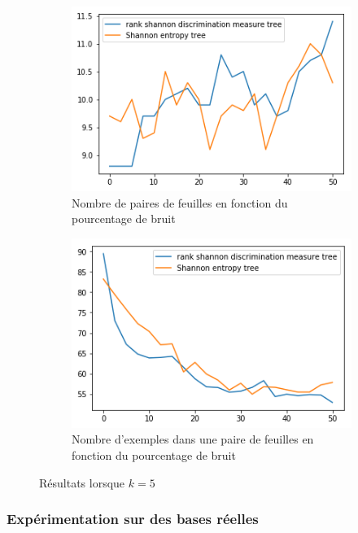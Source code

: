 \documentclass[a4paper]{article}
\begin{document}
\begin{figure}[H]
    \begin{subfigure}[c]{0.46\textwidth}
        \centering
        \includegraphics[width=\textwidth]{images/nbpairs_5.png}
        \caption{Nombre de paires de feuilles en fonction du pourcentage de bruit}
    \end{subfigure}
    \begin{subfigure}[c]{0.46\textwidth}
        \centering
        \includegraphics[width=\textwidth]{images/nbexamples_5.png}
        \caption{Nombre d'exemples dans une paire de feuilles en fonction du pourcentage de bruit}
    \end{subfigure}

    \caption{Résultats lorsque $k=5$}
    \label{results:artificial5}
\end{figure}

\subsubsection{Expérimentation sur des bases réelles}
\end{document}
